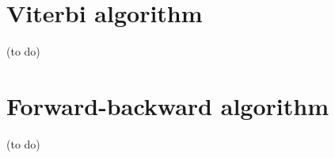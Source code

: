 \documentclass[12pt]{article}
\begin{document}
\section{Viterbi algorithm}

(to do)







\section{Forward-backward algorithm}

(to do)
\end{document}
